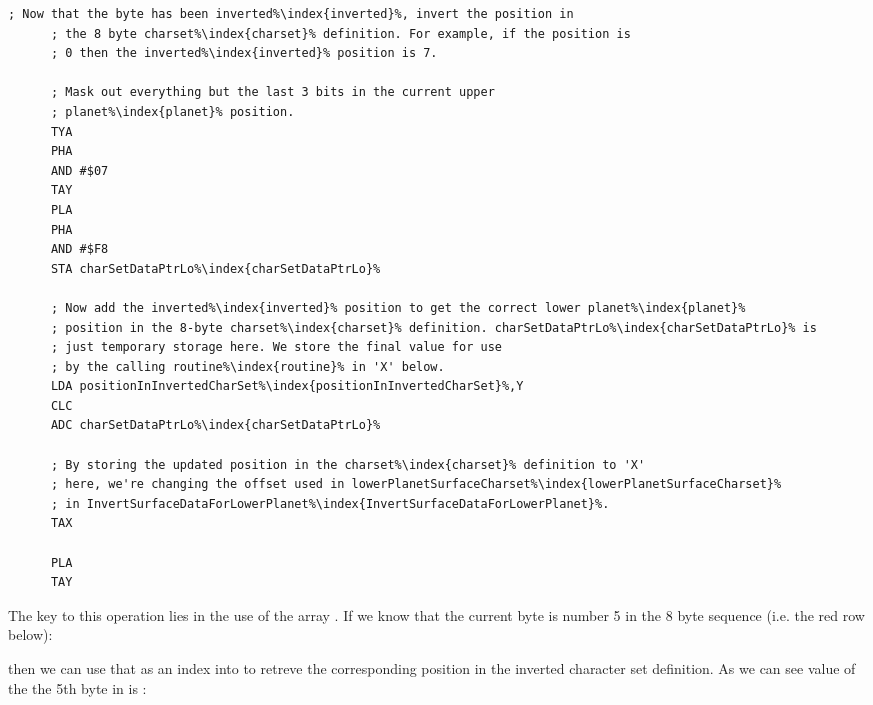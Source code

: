 \begin{lstlisting}[escapechar=\%]
      ; Now that the byte has been inverted%\index{inverted}%, invert the position in
      ; the 8 byte charset%\index{charset}% definition. For example, if the position is
      ; 0 then the inverted%\index{inverted}% position is 7.

      ; Mask out everything but the last 3 bits in the current upper
      ; planet%\index{planet}% position. 
      TYA
      PHA
      AND #$07
      TAY
      PLA
      PHA
      AND #$F8
      STA charSetDataPtrLo%\index{charSetDataPtrLo}%

      ; Now add the inverted%\index{inverted}% position to get the correct lower planet%\index{planet}%
      ; position in the 8-byte charset%\index{charset}% definition. charSetDataPtrLo%\index{charSetDataPtrLo}% is
      ; just temporary storage here. We store the final value for use
      ; by the calling routine%\index{routine}% in 'X' below.
      LDA positionInInvertedCharSet%\index{positionInInvertedCharSet}%,Y
      CLC
      ADC charSetDataPtrLo%\index{charSetDataPtrLo}%

      ; By storing the updated position in the charset%\index{charset}% definition to 'X'
      ; here, we're changing the offset used in lowerPlanetSurfaceCharset%\index{lowerPlanetSurfaceCharset}%
      ; in InvertSurfaceDataForLowerPlanet%\index{InvertSurfaceDataForLowerPlanet}%.
      TAX

      PLA
      TAY
\end{lstlisting}

The key to this operation lies in the use of the array .
If we know that the current byte is number 5 in the 8 byte sequence (i.e. the red row
below):

\begin{figure}[H]
{
  \setlength{\tabcolsep}{3.0pt}
  \setlength\cmidrulewidth{\heavyrulewidth} %
    \begin{adjustbox}{width=6cm,center}
  \begin{subfigure}{0.3\textwidth}
  
  \end{subfigure}
  \end{adjustbox}
}\caption[]{}
\end{figure}


then we can use that as an index into 
to retreve the corresponding position in the inverted character set definition. As we can
see value of the the 5th byte in  is :

